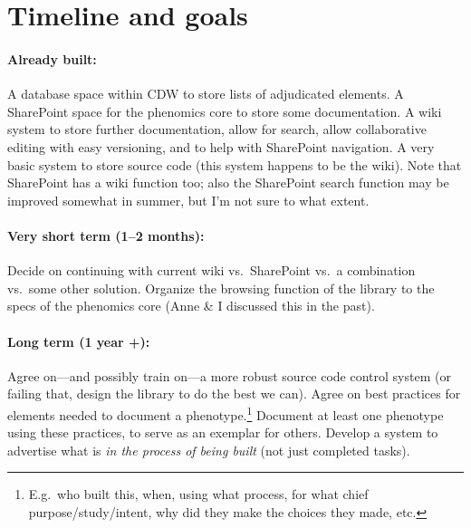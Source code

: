 \documentclass{tufte-handout}
\begin{document}

\section{Timeline and goals}

\paragraph{Already built:}
A database space within CDW to store lists of adjudicated elements. A
SharePoint space for the phenomics core to store some documentation. A
wiki system to store further documentation, allow for search, allow
collaborative editing with easy versioning, and to help with
SharePoint navigation. A very basic system to store source code (this
system happens to be the wiki). Note that SharePoint has a wiki
function too; also the SharePoint search function may be improved
somewhat in summer, but I'm not sure to what extent.

\paragraph{Very short term (1--2 months):}
Decide on continuing with current wiki vs.\ SharePoint vs.\ a
combination vs.\ some other solution. Organize the browsing function
of the library to the specs of the phenomics core (Anne \& I discussed
this in the past).

\paragraph{Long term (1 year +):}
Agree on---and possibly train on---a more robust source code control
system (or failing that, design the library to do the best we can).
Agree on best practices for elements needed to document a
phenotype.\footnote{E.g.\ who built this, when, using what process,
  for what chief purpose/study/intent, why did they make the choices
  they made, etc.} Document at least one phenotype using these
practices, to serve as an exemplar for others. Develop a system to
advertise what is \emph{in the process of being built} (not just
completed tasks).
\end{document}
